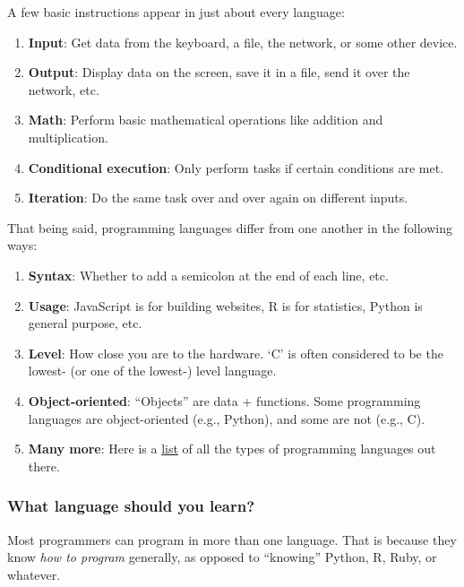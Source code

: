 \documentclass[
]{book}
\providecommand{\tightlist}{%
  \setlength{\itemsep}{0pt}\setlength{\parskip}{0pt}}
\begin{document}
A few basic instructions appear in just about every language:

\begin{enumerate}
\def\labelenumi{\arabic{enumi}.}
\tightlist
\item
  \textbf{Input}: Get data from the keyboard, a file, the network, or some other device.
\item
  \textbf{Output}: Display data on the screen, save it in a file, send it over the network, etc.
\item
  \textbf{Math}: Perform basic mathematical operations like addition and multiplication.
\item
  \textbf{Conditional execution}: Only perform tasks if certain conditions are met.
\item
  \textbf{Iteration}: Do the same task over and over again on different inputs.
\end{enumerate}

That being said, programming languages differ from one another in the following ways:

\begin{enumerate}
\def\labelenumi{\arabic{enumi}.}
\tightlist
\item
  \textbf{Syntax}: Whether to add a semicolon at the end of each line, etc.
\item
  \textbf{Usage}: JavaScript is for building websites, R is for statistics, Python is general purpose, etc.
\item
  \textbf{Level}: How close you are to the hardware. `C' is often considered to be the lowest- (or one of the lowest-) level language.
\item
  \textbf{Object-oriented}: ``Objects'' are data + functions. Some programming languages are object-oriented (e.g., Python), and some are not (e.g., C).
\item
  \textbf{Many more}: Here is a \href{https://en.wikipedia.org/wiki/List_of_programming_languages_by_type}{list} of all the types of programming languages out there.
\end{enumerate}

\hypertarget{what-language-should-you-learn}{%
\subsubsection*{What language should you learn?}\label{what-language-should-you-learn}}

Most programmers can program in more than one language. That is because they know \emph{how to program} generally, as opposed to ``knowing'' Python, R, Ruby, or whatever.
\end{document}
